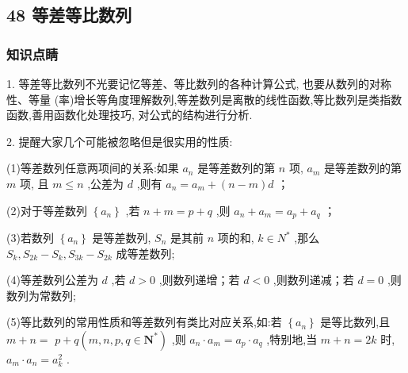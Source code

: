 \subsection*{48 等差等比数列}

\subsubsection*{知识点睛}

1. 等差等比数列不光要记忆等差、等比数列的各种计算公式, 也要从数列的对称性、等量 (率)增长等角度理解数列,等差数列是离散的线性函数,等比数列是类指数函数,善用函数化处理技巧, 对公式的结构进行分析.

2. 提醒大家几个可能被忽略但是很实用的性质:

(1)等差数列任意两项间的关系:如果 ${a}_{n}$ 是等差数列的第 $n$ 项, ${a}_{m}$ 是等差数列的第 $m$ 项, 且 $m \leq  n$ ,公差为 $d$ ,则有 ${a}_{n} = {a}_{m} + \left( {n - m}\right) d$ ；

(2)对于等差数列 $\left\{  {a}_{n}\right\}$ ,若 $n + m = p + q$ ,则 ${a}_{n} + {a}_{m} = {a}_{p} + {a}_{q}$ ；

(3)若数列 $\left\{  {a}_{n}\right\}$ 是等差数列, ${S}_{n}$ 是其前 $n$ 项的和, $k \in  {{N}}^{ * }$ ,那么 ${S}_{k},{S}_{2k} - {S}_{k},{S}_{3k} - {S}_{2k}$ 成等差数列;

(4)等差数列公差为 $d$ ,若 $d > 0$ ,则数列递增；若 $d < 0$ ,则数列递减；若 $d = 0$ ,则数列为常数列;

(5)等比数列的常用性质和等差数列有类比对应关系,如:若 $\left\{  {a}_{n}\right\}$ 是等比数列,且 $m + n =$  $p + q\left( {m,n,p,q \in  {\mathbf{N}}^{ * }}\right)$ ,则 ${a}_{n} \cdot  {a}_{m} = {a}_{p} \cdot  {a}_{q}$ ,特别地,当 $m + n = {2k}$ 时, ${a}_{m} \cdot  {a}_{n} = {a}_{k}^{2}$ .

